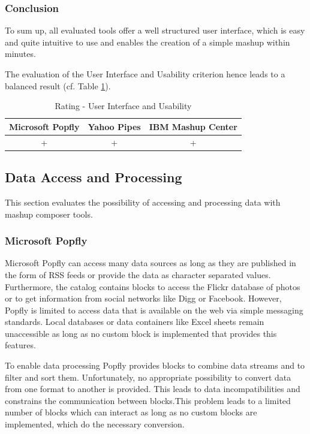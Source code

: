 \subsubsection{Conclusion}

To sum up, all evaluated tools offer a well structured user interface, which is
easy and quite intuitive to use and enables the creation of a simple mashup within minutes.

The evaluation of the User Interface and Usability criterion hence leads to a balanced
result (cf. Table \ref{tab:RatingUserInterfaceAndUsability}).

\begin{table}[h]
	\centering
		\begin{tabular}{|c|c|c|}
			\hline
				\textbf{Microsoft Popfly} & \textbf{Yahoo Pipes} & \textbf{IBM Mashup Center}\\
				\hline\hline
				+ & + & +\\
			\hline
		\end{tabular}
	\caption{Rating - User Interface and Usability}
	\label{tab:RatingUserInterfaceAndUsability}
\end{table}

\subsection{Data Access and Processing}
\label{sec:data_access_and_aggregation}

This section evaluates the possibility of accessing and processing data with mashup composer tools.

\subsubsection{Microsoft Popfly}
Microsoft Popfly can access many data sources as long as they are published in the form of RSS feeds
or provide the data as character separated values. Furthermore, the catalog contains blocks to access
the Flickr database of photos or to get information from social networks like Digg or
Facebook. However, Popfly is limited to access data that is available on the web via simple
messaging standards. Local databases or data containers like Excel sheets remain unaccessible as long
as no custom block is implemented that provides this features.

To enable data processing Popfly provides blocks to combine data streams and to filter and sort
them. Unfortunately, no appropriate possibility to convert data from one format to another is
provided. This leads to data incompatibilities and constrains the communication between
blocks.\newline This problem leads to a limited number of blocks which can interact as long as no
custom blocks are implemented, which do the necessary conversion.

